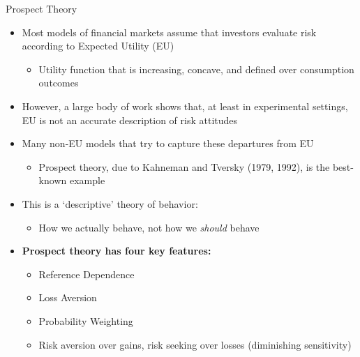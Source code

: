 \documentclass[aspectratio=169, 11pt]{beamer}
\begin{document}
\begin{frame}[shrink=5]{Prospect Theory}
\begin{itemize}
\item Most models of financial markets assume that investors evaluate risk according to Expected Utility (EU)
  \begin{itemize}
  \item Utility function that is increasing, concave, and defined over consumption outcomes
  \end{itemize}
\item However, a large body of work shows that, at least in experimental settings, EU is not an accurate description of risk attitudes
\item Many non-EU models that try to capture these departures from EU
  \begin{itemize}
  \item Prospect theory, due to Kahneman and Tversky (1979, 1992), is the best-known example
  \end{itemize}
\item This is a `descriptive' theory of behavior:
  \begin{itemize}
  \item How we actually behave, not how we \emph{should} behave
  \end{itemize}
\item \textbf{Prospect theory has four key features:}
  \begin{itemize}
  \item Reference Dependence
  \item Loss Aversion
  \item Probability Weighting
  \item Risk aversion over gains, risk seeking over losses (diminishing sensitivity)
  \end{itemize}
\end{itemize}
\end{frame}
\end{document}
